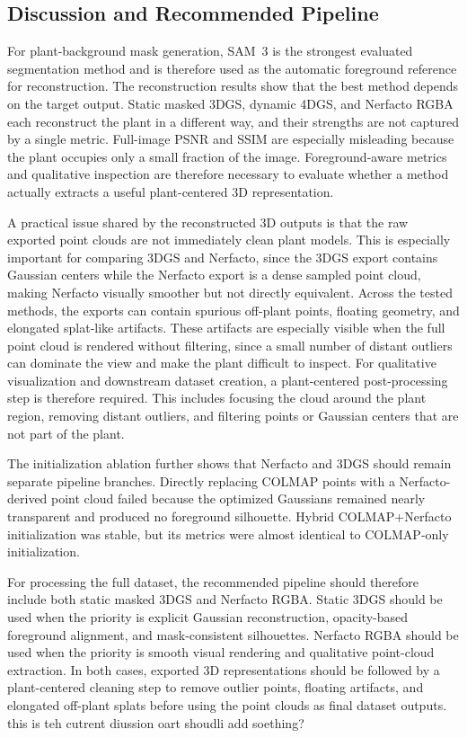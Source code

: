 \documentclass[sigconf]{acmart}
\begin{document}

\subsection{Discussion and Recommended Pipeline}

For plant-background mask generation, SAM~3 is the strongest evaluated segmentation method and is therefore used as the automatic foreground reference for reconstruction. The reconstruction results show that the best method depends on the target output. Static masked 3DGS, dynamic 4DGS, and Nerfacto RGBA each reconstruct the plant in a different way, and their strengths are not captured by a single metric. Full-image PSNR and SSIM are especially misleading because the plant occupies only a small fraction of the image. Foreground-aware metrics and qualitative inspection are therefore necessary to evaluate whether a method actually extracts a useful plant-centered 3D representation.

A practical issue shared by the reconstructed 3D outputs is that the raw exported point clouds are not immediately clean plant models. This is especially important for comparing 3DGS and Nerfacto, since the 3DGS export contains Gaussian centers while the Nerfacto export is a dense sampled point cloud, making Nerfacto visually smoother but not directly equivalent. Across the tested methods, the exports can contain spurious off-plant points, floating geometry, and elongated splat-like artifacts. These artifacts are especially visible when the full point cloud is rendered without filtering, since a small number of distant outliers can dominate the view and make the plant difficult to inspect. For qualitative visualization and downstream dataset creation, a plant-centered post-processing step is therefore required. This includes focusing the cloud around the plant region, removing distant outliers, and filtering points or Gaussian centers that are not part of the plant. 

The initialization ablation further shows that Nerfacto and 3DGS should remain separate pipeline branches. Directly replacing COLMAP points with a Nerfacto-derived point cloud failed because the optimized Gaussians remained nearly transparent and produced no foreground silhouette. Hybrid COLMAP+Nerfacto initialization was stable, but its metrics were almost identical to COLMAP-only initialization.

For processing the full dataset, the recommended pipeline should therefore include both static masked 3DGS and Nerfacto RGBA. Static 3DGS should be used when the priority is explicit Gaussian reconstruction, opacity-based foreground alignment, and mask-consistent silhouettes. Nerfacto RGBA should be used when the priority is smooth visual rendering and qualitative point-cloud extraction. In both cases, exported 3D representations should be followed by a plant-centered cleaning step to remove outlier points, floating artifacts, and elongated off-plant splats before using the point clouds as final dataset outputs.
this is teh cutrent diussion oart shoudli add soething? 
\end{document}
